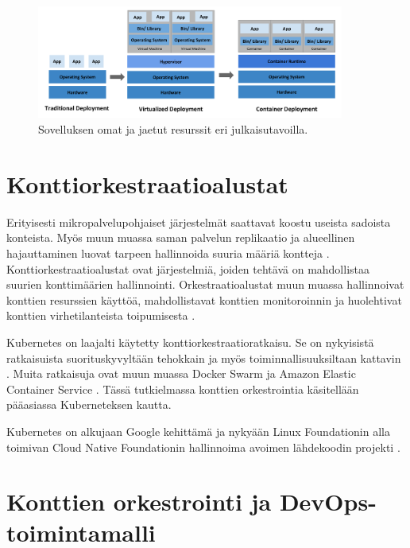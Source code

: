 \begin{figure}[ht]
\begin{center}
\includegraphics[width=0.9\textwidth]{figures/container_evolution.png}
\caption{Sovelluksen omat ja jaetut resurssit eri julkaisutavoilla.\cite{Kubernetes23}\label{fig:container}}
\end{center}
\end{figure}

\section{Konttiorkestraatioalustat}


Erityisesti mikropalvelupohjaiset järjestelmät saattavat koostu useista sadoista konteista.
Myös muun muassa saman palvelun replikaatio ja alueellinen hajauttaminen luovat tarpeen hallinnoida suuria määriä kontteja \cite{Khan17}.
Konttiorkestraatioalustat ovat järjestelmiä, joiden tehtävä on mahdollistaa suurien konttimäärien hallinnointi.
Orkestraatioalustat muun muassa hallinnoivat konttien resurssien käyttöä, mahdollistavat konttien monitoroinnin ja huolehtivat konttien virhetilanteista toipumisesta \cite{Zhou21}.

Kubernetes on laajalti käytetty konttiorkestraatioratkaisu. Se on nykyisistä ratkaisuista suorituskyvyltään tehokkain ja myös toiminnallisuuksiltaan kattavin \cite{Jawarneh19}. Muita ratkaisuja ovat muun muassa Docker Swarm ja Amazon Elastic Container Service \cite{Khan17}. Tässä tutkielmassa konttien orkestrointia käsitellään pääasiassa Kuberneteksen kautta.


Kubernetes on alkujaan Google kehittämä ja nykyään Linux Foundationin alla toimivan Cloud Native Foundationin hallinnoima avoimen lähdekoodin projekti \cite{Burns22}.

\section{Konttien orkestrointi ja DevOps-toimintamalli}
